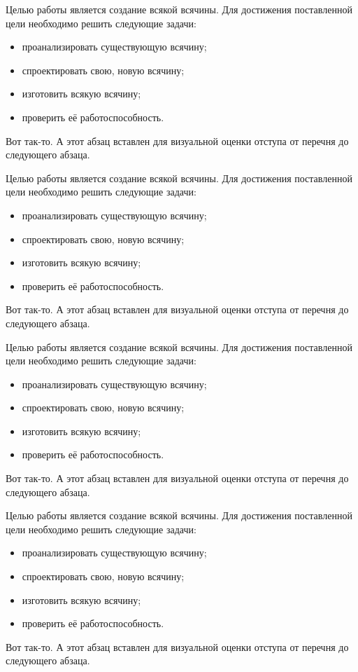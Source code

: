 \documentclass[a4paper, 14pt]{extarticle}
\begin{document}




Целью работы является создание всякой всячины. Для достижения поставленной цели необходимо решить следующие задачи:

\begin{itemize}
\item проанализировать существующую всячину;
\item спроектировать свою, новую всячину;
\item изготовить всякую всячину;
\item проверить её работоспособность.
\end{itemize}

Вот так-то. А этот абзац вставлен для визуальной оценки отступа от перечня до следующего абзаца.

Целью работы является создание всякой всячины. Для достижения поставленной цели необходимо решить следующие задачи:

\begin{itemize}
\item проанализировать существующую всячину;
\item спроектировать свою, новую всячину;
\item изготовить всякую всячину;
\item проверить её работоспособность.
\end{itemize}

Вот так-то. А этот абзац вставлен для визуальной оценки отступа от перечня до следующего абзаца.


Целью работы является создание всякой всячины. Для достижения поставленной цели необходимо решить следующие задачи:

\begin{itemize}
\item проанализировать существующую всячину;
\item спроектировать свою, новую всячину;
\item изготовить всякую всячину;
\item проверить её работоспособность.
\end{itemize}

Вот так-то. А этот абзац вставлен для визуальной оценки отступа от перечня до следующего абзаца.






Целью работы является создание всякой всячины. Для достижения поставленной цели необходимо решить следующие задачи:

\begin{itemize}
\item проанализировать существующую всячину;
\item спроектировать свою, новую всячину;
\item изготовить всякую всячину;
\item проверить её работоспособность.
\end{itemize}

Вот так-то. А этот абзац вставлен для визуальной оценки отступа от перечня до следующего абзаца.
\end{document}
